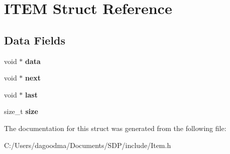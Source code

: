 \hypertarget{struct_i_t_e_m}{\section{I\-T\-E\-M Struct Reference}
\label{struct_i_t_e_m}
}
\subsection*{Data Fields}
\begin{DoxyCompactItemize}
\item 
\hypertarget{struct_i_t_e_m_a735984d41155bc1032e09bece8f8d66d}{void $\ast$ {\bfseries data}}\label{struct_i_t_e_m_a735984d41155bc1032e09bece8f8d66d}

\item 
\hypertarget{struct_i_t_e_m_ae870f212f5e04923cf5cde80f37def93}{void $\ast$ {\bfseries next}}\label{struct_i_t_e_m_ae870f212f5e04923cf5cde80f37def93}

\item 
\hypertarget{struct_i_t_e_m_aeb2a0ce4602c86a277ac94d98da0dc0b}{void $\ast$ {\bfseries last}}\label{struct_i_t_e_m_aeb2a0ce4602c86a277ac94d98da0dc0b}

\item 
\hypertarget{struct_i_t_e_m_a854352f53b148adc24983a58a1866d66}{size\-\_\-t {\bfseries size}}\label{struct_i_t_e_m_a854352f53b148adc24983a58a1866d66}

\end{DoxyCompactItemize}


The documentation for this struct was generated from the following file\-:\begin{DoxyCompactItemize}
\item 
C\-:/\-Users/dagoodma/\-Documents/\-S\-D\-P/include/Item.\-h\end{DoxyCompactItemize}
